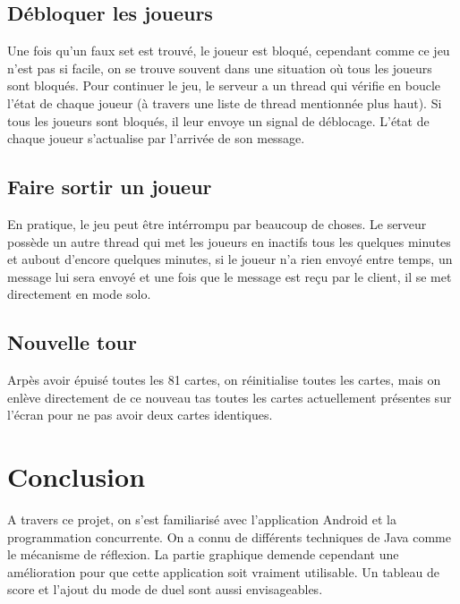 \documentclass[paper=a4, french]{scrartcl} %
\begin{document}
\subsection{Débloquer les joueurs}
Une fois qu'un faux set est trouvé, le joueur est bloqué, cependant comme ce jeu n'est pas si facile, on se trouve souvent dans une situation où tous les joueurs sont bloqués. Pour continuer le jeu, le serveur a un thread qui vérifie en boucle l'état de chaque joueur (à travers une liste de thread mentionnée plus haut). Si tous les joueurs sont bloqués, il leur envoye un signal de déblocage. L'état de chaque joueur s'actualise par l'arrivée de son message.

\subsection{Faire sortir un joueur}
En pratique, le jeu peut être intérrompu par beaucoup de choses. Le serveur possède un autre thread qui met les joueurs en inactifs tous les quelques minutes et aubout d'encore quelques minutes, si le joueur n'a rien envoyé entre temps, un message lui sera envoyé et une fois que le message est reçu par le client, il se met directement en mode solo.

\subsection{Nouvelle tour}
Arpès avoir épuisé toutes les 81 cartes, on réinitialise toutes les cartes, mais on enlève directement de ce nouveau tas toutes les cartes actuellement présentes sur l'écran pour ne pas avoir deux cartes identiques.



\section{Conclusion}


A travers ce projet, on s'est familiarisé avec l'application Android et la programmation concurrente. On a connu de différents techniques de Java comme le mécanisme de réflexion. La partie graphique demende cependant une amélioration pour que cette application soit vraiment utilisable. Un tableau de score et l'ajout du mode de duel sont aussi envisageables.

\end{document}
